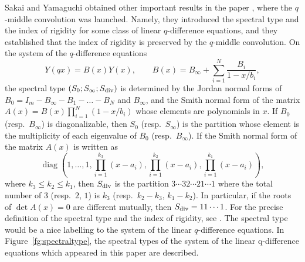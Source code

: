 \documentclass[pdftex]{sigma}
\numberwithin{equation}{section}
\theoremstyle{definition}
\begin{document}
Sakai and Yamaguchi obtained other important results in the paper \cite{SY}, where the $q$-middle convolution was launched.
Namely, they introduced the spectral type and the index of rigidity for some class of linear $q$-difference equations, and they established that the index of rigidity is preserved by the $q$-middle convolution.
On the system of the $q$-difference equations
\[
 Y(qx)= B(x) Y(x), \qquad B(x)= B_{\infty}+\sum_{i=1}^N \frac{B_i}{1-x/b_i} ,
 \]
the spectral type $( S_0; S_{\infty }; S_{\rm div} )$ is determined by the Jordan normal forms of $B_0 = I_m - B_\infty - B_{1} - \dots -B_N$ and $B_{\infty } $, and the Smith normal form of the matrix $A(x)= B(x) \prod _{i=1} ^N (1-x/b_i)$ whose elements are polynomials in $x$.
If $B_0$ (resp.~$B_{\infty}$) is diagonalizable, then $S_0$ (resp.~$S_{\infty}$) is the partition whose element is the multiplicity of each eigenvalue of $B_0$ (resp.~$B_{\infty}$).
If the Smith normal form of the matrix $A(x)$ is written as
\[
\operatorname{diag}\left(1, \dots , 1, \prod _{i=1}^{k_3} (x-a_i), \prod _{i=1}^{k_2} (x-a_i), \prod _{i=1}^{k_1} (x-a_i)\right),
\] where $k_3 \leq k_2 \leq k_1$, then $S_{\rm div}$ is the partition $3\cdots 32\cdots 21\cdots 1$ where the total number of $3$ (resp.~$2$, $1$) is $k_3$ (resp.~$k_2-k_3$, $k_1-k_2$).
In particular, if the roots of $\det A(x) =0$ are different mutually, then $S_{\rm div} = 11\cdots 1$.
For the precise definition of the spectral type and the index of rigidity, see \cite{SY}.
The spectral type would be a nice labelling to the system of the linear $q$-difference equations.
In Figure~\ref{fg:spectraltype}, the spectral types of the system of the linear q-difference equations which appeared in this paper are described.
\end{document}
